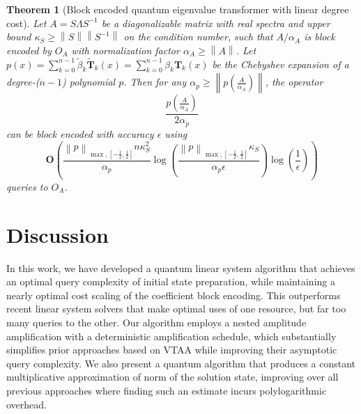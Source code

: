 \documentclass[letterpaper,onecolumn,11pt,accepted=2026-02-14]{quantumarticle}
\newcommand{\norm}[1]{\left\lVert#1\right\rVert}
\newtheorem{theorem}{Theorem}
\theoremstyle{remark}
\theoremstyle{plain}
\begin{document}
\begin{theorem}[Block encoded quantum eigenvalue transformer with linear degree cost]
\label{thm:qevt_blk}
Let $A=S\Lambda S^{-1}$ be a diagonalizable matrix with real spectra and upper bound $\kappa_S\geq\norm{S}\norm{S^{-1}}$ on the condition number, such that $A/\alpha_A$ is block encoded by $O_A$ with normalization factor $\alpha_A\geq\norm{A}$.
Let $p(x)=\sum_{k=0}^{n-1}\widetilde\beta_k\widetilde{\mathbf{T}}_{k}(x)=\sum_{k=0}^{n-1}\beta_k{\mathbf{T}}_{k}(x)$ be the Chebyshev expansion of a degree-($n-1$) polynomial $p$.
Then for any $\alpha_p\geq\norm{p\left(\frac{A}{\alpha_A}\right)}$, the operator
    \begin{equation}
        \frac{p\left(\frac{A}{\alpha_A}\right)}{2\alpha_p}
    \end{equation}
    can be block encoded with accuracy $\epsilon$ using
    \begin{equation}
        \mathbf{O}\left(\frac{\norm{p}_{\max,\left[-\frac{1}{2},\frac{1}{2}\right]}n\kappa_S^2}{\alpha_p}\log\left(\frac{\norm{p}_{\max,\left[-\frac{1}{2},\frac{1}{2}\right]}\kappa_S}{\alpha_p\epsilon}\right)\log\left(\frac{1}{\epsilon}\right)\right)
    \end{equation}
    queries to $O_A$.
\end{theorem}

\section{Discussion}
\label{sec:discuss}
In this work, we have developed a quantum linear system algorithm that achieves an optimal query complexity of initial state preparation, while maintaining a nearly optimal cost scaling of the coefficient block encoding. This outperforms recent linear system solvers that make optimal uses of one resource, but far too many queries to the other. Our algorithm employs a nested amplitude amplification with a deterministic amplification schedule, which substantially simplifies prior approaches based on VTAA while improving their asymptotic query complexity. We also present a quantum algorithm that produces a constant multiplicative approximation of norm of the solution state, improving over all previous approaches where finding such an estimate incurs polylogarithmic overhead.
\end{document}
